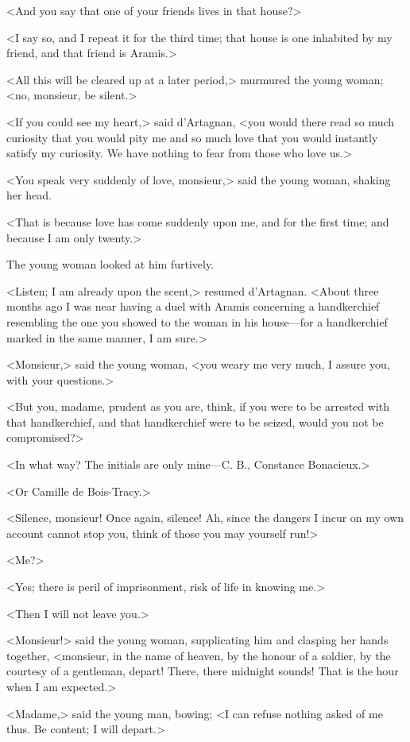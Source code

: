 <And you say that one of your friends lives in that house?> 

<I say so, and I repeat it for the third time; that house is one inhabited by my friend, and that friend is Aramis.> 

<All this will be cleared up at a later period,> murmured the young woman; <no, monsieur, be silent.> 

<If you could see my heart,> said d'Artagnan, <you would there read so much curiosity that you would pity me and so much love that you would instantly satisfy my curiosity. We have nothing to fear from those who love us.> 

<You speak very suddenly of love, monsieur,> said the young woman, shaking her head. 

<That is because love has come suddenly upon me, and for the first time; and because I am only twenty.> 

The young woman looked at him furtively. 

<Listen; I am already upon the scent,> resumed d'Artagnan. <About three months ago I was near having a duel with Aramis concerning a handkerchief resembling the one you showed to the woman in his house---for a handkerchief marked in the same manner, I am sure.> 

<Monsieur,> said the young woman, <you weary me very much, I assure you, with your questions.> 

<But you, madame, prudent as you are, think, if you were to be arrested with that handkerchief, and that handkerchief were to be seized, would you not be compromised?> 

<In what way? The initials are only mine---C. B., Constance Bonacieux.> 

<Or Camille de Bois-Tracy.> 

<Silence, monsieur! Once again, silence! Ah, since the dangers I incur on my own account cannot stop you, think of those you may yourself run!> 

<Me?> 

<Yes; there is peril of imprisonment, risk of life in knowing me.> 

<Then I will not leave you.> 

<Monsieur!> said the young woman, supplicating him and clasping her hands together, <monsieur, in the name of heaven, by the honour of a soldier, by the courtesy of a gentleman, depart! There, there midnight sounds! That is the hour when I am expected.> 

<Madame,> said the young man, bowing; <I can refuse nothing asked of me thus. Be content; I will depart.> 


